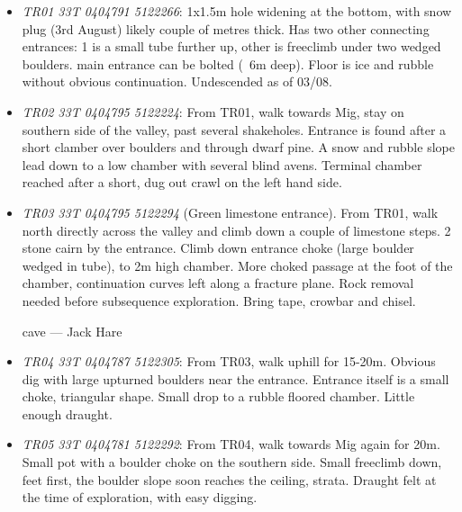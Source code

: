 	

\begin{itemize}
	\item \emph{TR01 33T 0404791 5122266}: 1x1.5m hole widening at the bottom, with snow plug (3rd August) likely couple of metres thick. Has two other connecting entrances: 1 is a small tube further up, other is freeclimb under two wedged boulders. main entrance can be bolted (~6m deep). Floor is ice and rubble without obvious continuation. Undescended as of 03/08. 

	\item \emph{TR02 33T 0404795 5122224}: From TR01, walk towards Mig, stay on southern side of the valley, past several shakeholes. Entrance is found after a short clamber over boulders and through dwarf pine.  A snow and rubble slope lead down to a low chamber with several blind avens. Terminal chamber reached after a short, dug out crawl on the left hand side.

	\item \emph{TR03 33T 0404795 5122294} (Green limestone entrance). From TR01, walk north directly across the valley and climb down a couple of limestone steps. 2 stone cairn by the entrance.  Climb down entrance choke (large boulder wedged in tube), to 2m high chamber. More choked passage at the foot of the chamber, continuation curves left along a fracture plane. Rock removal needed before subsequence exploration. Bring tape, crowbar and chisel.
	
	 \begin{marginfigure}
        		\centering
        		\caption{cave --- Jack Hare} 
		\label{cave}
        \end{marginfigure}
        
	\item \emph{TR04 33T 0404787 5122305}: From TR03, walk uphill for 15-20m. Obvious dig with large upturned boulders near the entrance. Entrance itself is a small choke, triangular shape. Small drop to a rubble floored chamber. Little enough draught.

	\item \emph{TR05 33T 0404781 5122292}: From TR04, walk towards Mig again for 20m. Small pot with a boulder choke on the southern side. Small freeclimb down, feet first, the boulder slope soon reaches the ceiling, strata. Draught felt at the time of exploration, with easy digging.


\end{itemize}
